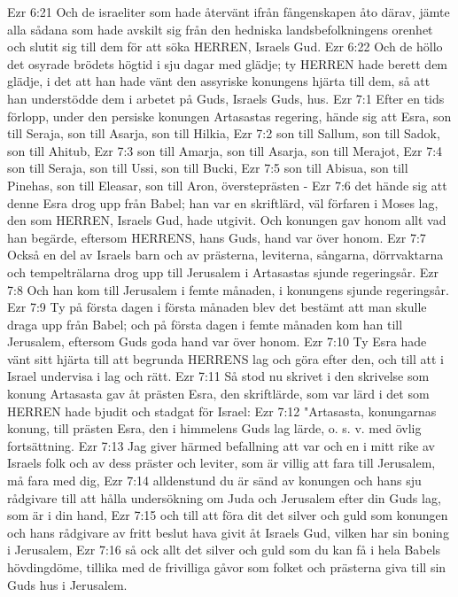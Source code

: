 Ezr 6:21  Och de israeliter som hade återvänt ifrån fångenskapen åto därav, jämte alla sådana som hade avskilt sig från den hedniska landsbefolkningens orenhet och slutit sig till dem för att söka HERREN, Israels Gud.
Ezr 6:22  Och de höllo det osyrade brödets högtid i sju dagar med glädje; ty HERREN hade berett dem glädje, i det att han hade vänt den assyriske konungens hjärta till dem, så att han understödde dem i arbetet på Guds, Israels Guds, hus.
Ezr 7:1  Efter en tids förlopp, under den persiske konungen Artasastas regering, hände sig att Esra, son till Seraja, son till Asarja, son till Hilkia,
Ezr 7:2  son till Sallum, son till Sadok, son till Ahitub,
Ezr 7:3  son till Amarja, son till Asarja, son till Merajot,
Ezr 7:4  son till Seraja, son till Ussi, son till Bucki,
Ezr 7:5  son till Abisua, son till Pinehas, son till Eleasar, son till Aron, översteprästen -
Ezr 7:6  det hände sig att denne Esra drog upp från Babel; han var en skriftlärd, väl förfaren i Moses lag, den som HERREN, Israels Gud, hade utgivit. Och konungen gav honom allt vad han begärde, eftersom HERRENS, hans Guds, hand var över honom.
Ezr 7:7  Också en del av Israels barn och av prästerna, leviterna, sångarna, dörrvaktarna och tempelträlarna drog upp till Jerusalem i Artasastas sjunde regeringsår.
Ezr 7:8  Och han kom till Jerusalem i femte månaden, i konungens sjunde regeringsår.
Ezr 7:9  Ty på första dagen i första månaden blev det bestämt att man skulle draga upp från Babel; och på första dagen i femte månaden kom han till Jerusalem, eftersom Guds goda hand var över honom.
Ezr 7:10  Ty Esra hade vänt sitt hjärta till att begrunda HERRENS lag och göra efter den, och till att i Israel undervisa i lag och rätt.
Ezr 7:11  Så stod nu skrivet i den skrivelse som konung Artasasta gav åt prästen Esra, den skriftlärde, som var lärd i det som HERREN hade bjudit och stadgat för Israel:
Ezr 7:12  "Artasasta, konungarnas konung, till prästen Esra, den i himmelens Guds lag lärde, o. s. v. med övlig fortsättning.
Ezr 7:13  Jag giver härmed befallning att var och en i mitt rike av Israels folk och av dess präster och leviter, som är villig att fara till Jerusalem, må fara med dig,
Ezr 7:14  alldenstund du är sänd av konungen och hans sju rådgivare till att hålla undersökning om Juda och Jerusalem efter din Guds lag, som är i din hand,
Ezr 7:15  och till att föra dit det silver och guld som konungen och hans rådgivare av fritt beslut hava givit åt Israels Gud, vilken har sin boning i Jerusalem,
Ezr 7:16  så ock allt det silver och guld som du kan få i hela Babels hövdingdöme, tillika med de frivilliga gåvor som folket och prästerna giva till sin Guds hus i Jerusalem.
